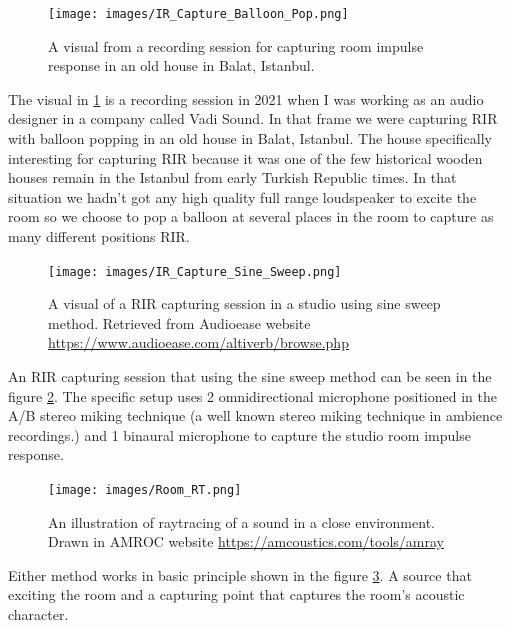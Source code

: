             \begin{figure}[H]
                \centering
                \texttt{[image: images/IR\_Capture\_Balloon\_Pop.png]}
                \caption{A visual from a recording session for capturing room impulse response in an old house in Balat, Istanbul.}
                \label{fig:IR_BALLOON}
            \end{figure}            

            The visual in \ref{fig:IR_BALLOON} is a recording session in 2021 when I was working as an audio designer in a company called Vadi Sound. In that frame we were capturing RIR with balloon popping in an old house in Balat, Istanbul. The house specifically interesting for capturing RIR because it was one of the few historical wooden houses remain in the Istanbul from early Turkish Republic times. In that situation we hadn't got any high quality full range loudspeaker to excite the room so we choose to pop a balloon at several places in the room to capture as many different positions RIR.\par

            \begin{figure}[H]
                \centering
                \texttt{[image: images/IR\_Capture\_Sine\_Sweep.png]}
                \caption{A visual of a RIR capturing session in a studio using sine sweep method. Retrieved from Audioease website \url{https://www.audioease.com/altiverb/browse.php}}
                \label{fig:IR_SINE}
            \end{figure}

            An RIR capturing session that using the sine sweep method can be seen in the figure \ref{fig:IR_SINE}. The specific setup uses 2 omnidirectional microphone positioned in the A/B stereo miking technique (a well known stereo miking technique in ambience recordings.)\cite{Sound_Reinforcement}\cite{Professional_Microphone_Techniques} and 1 binaural microphone to capture the studio room impulse response.\par

            \begin{figure}[H]
                \centering
                \texttt{[image: images/Room\_RT.png]}
                \caption{An illustration of raytracing of a sound in a close environment. Drawn in AMROC website \url{https://amcoustics.com/tools/amray}}
                \label{fig:IR_RAYTRACE}
            \end{figure}

            Either method works in basic principle shown in the figure \ref{fig:IR_RAYTRACE}. A source that exciting the room and a capturing point that captures the room's acoustic character.\par

